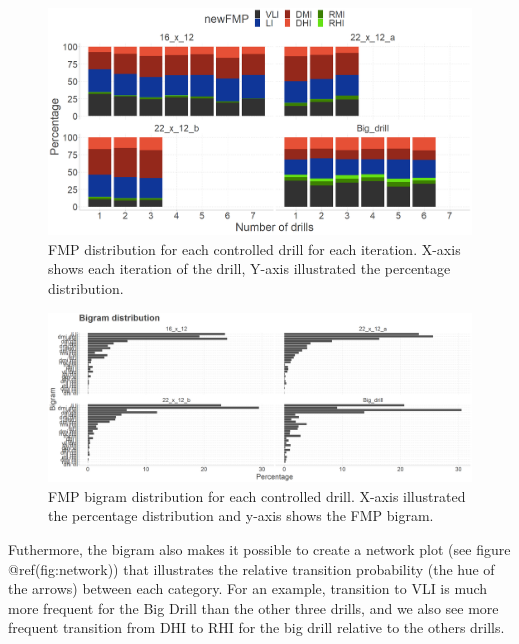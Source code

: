 \documentclass[
]{article}
\begin{document}
\begin{figure}

{\centering \includegraphics[width=1\linewidth]{img/distributionStackedPlot} 

}

\caption{FMP distribution for each controlled drill for each iteration. X-axis shows each iteration of the drill, Y-axis illustrated the percentage distribution.}\label{fig:distribution}
\end{figure}

\begin{figure}

{\centering \includegraphics[width=1\linewidth]{img/bigramDistribution} 

}

\caption{FMP bigram distribution for each controlled drill. X-axis illustrated the percentage distribution and y-axis shows the FMP bigram.}\label{fig:bigram}
\end{figure}

Futhermore, the bigram also makes it possible to create a network plot
(see figure @ref(fig:network)) that illustrates the relative transition
probability (the hue of the arrows) between each category. For an
example, transition to VLI is much more frequent for the Big Drill than
the other three drills, and we also see more frequent transition from
DHI to RHI for the big drill relative to the others drills.
\end{document}
